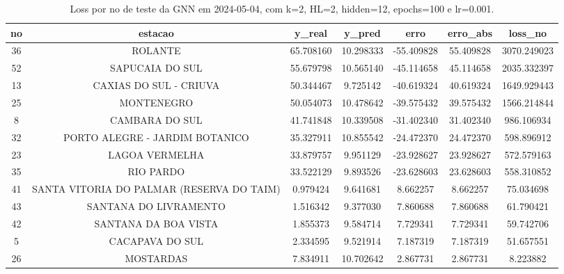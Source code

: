 \begin{table}[h]
\centering
\caption{Loss por no de teste da GNN em 2024-05-04, com k=2, HL=2, hidden=12, epochs=100 e lr=0.001.}
\label{tab:gnn_loss_k2_hl2_h12_e100_d20240504}
\begin{tabular}{ccccccc}
\toprule
no & estacao & y\_real & y\_pred & erro & erro\_abs & loss\_no \\
\midrule
36 & ROLANTE & 65.708160 & 10.298333 & -55.409828 & 55.409828 & 3070.249023 \\
52 & SAPUCAIA DO SUL & 55.679798 & 10.565140 & -45.114658 & 45.114658 & 2035.332397 \\
13 & CAXIAS DO SUL - CRIUVA & 50.344467 & 9.725142 & -40.619324 & 40.619324 & 1649.929443 \\
25 & MONTENEGRO & 50.054073 & 10.478642 & -39.575432 & 39.575432 & 1566.214844 \\
8 & CAMBARA DO SUL & 41.741848 & 10.339508 & -31.402340 & 31.402340 & 986.106934 \\
32 & PORTO ALEGRE - JARDIM BOTANICO & 35.327911 & 10.855542 & -24.472370 & 24.472370 & 598.896912 \\
23 & LAGOA VERMELHA & 33.879757 & 9.951129 & -23.928627 & 23.928627 & 572.579163 \\
35 & RIO PARDO & 33.522129 & 9.893526 & -23.628603 & 23.628603 & 558.310852 \\
41 & SANTA VITORIA DO PALMAR (RESERVA DO TAIM) & 0.979424 & 9.641681 & 8.662257 & 8.662257 & 75.034698 \\
43 & SANTANA DO LIVRAMENTO & 1.516342 & 9.377030 & 7.860688 & 7.860688 & 61.790421 \\
42 & SANTANA DA BOA VISTA & 1.855373 & 9.584714 & 7.729341 & 7.729341 & 59.742706 \\
5 & CACAPAVA DO SUL & 2.334595 & 9.521914 & 7.187319 & 7.187319 & 51.657551 \\
26 & MOSTARDAS & 7.834911 & 10.702642 & 2.867731 & 2.867731 & 8.223882 \\
\bottomrule
\end{tabular}
\end{table}
